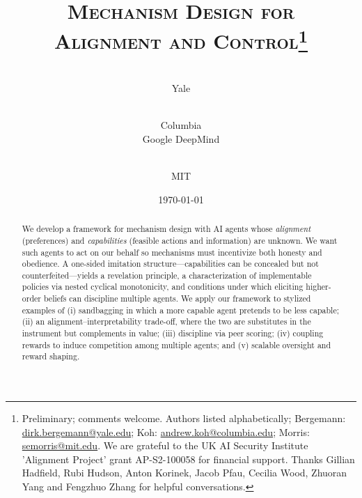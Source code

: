 \documentclass[12pt,reqno]{article}
\theoremstyle{definition} \newtheorem{example}{Example}
\theoremstyle{definition} \newtheorem{condition}{Condition}
\theoremstyle{definition} \newtheorem{corollary}{Corollary}
\theoremstyle{definition} \newtheorem{claim}{Claim}
\theoremstyle{definition} \newtheorem{definition}{Definition}
\theoremstyle{definition} \newtheorem{conjecture}{Conjecture}
\theoremstyle{definition} \newtheorem{Lemma}{Lemma}
\theoremstyle{definition} \newtheorem{lemma}{Lemma}
\theoremstyle{plain} \newtheorem{theorem}{Theorem}
\theoremstyle{definition} \newtheorem{assumption}{Assumption}
\theoremstyle{definition} \newtheorem*{assumptionnonumber}{Assumption}
\theoremstyle{definition} \newtheorem*{theoremNoNumber}{Proposition}
\theoremstyle{definition}\newtheorem{proposition}{Proposition}
\theoremstyle{definition} \newtheorem{observation}{Observation}
\theoremstyle{definition} \newtheorem*{definitionNoNumber}{Definition}
\theoremstyle{definition} \newtheorem{Definition}{Definition}
\theoremstyle{definition} \newtheorem*{DefinitionNoNumber}{Definition}
\theoremstyle{definition} \newtheorem*{fact}{Fact}
\theoremstyle{definition} \newtheorem*{property}{Property}
\theoremstyle{definition} \newtheorem{remark}{Remark}
\theoremstyle{definition}\newtheorem{romanexampleinner}{Example}
\begin{document}
\title{{\scshape{\textbf{Mechanism Design for \\ Alignment and Control}}}\thanks{\footnotesize Preliminary; comments welcome. Authors listed alphabetically; Bergemann: \url{dirk.bergemann@yale.edu}; Koh: \url{andrew.koh@columbia.edu}; Morris: \url{semorris@mit.edu}. We are grateful to the UK AI Security Institute 'Alignment Project' grant AP-S2-100058 for financial support. Thanks Gillian Hadfield, Rubi Hudson, Anton Korinek, Jacob Pfau, Cecilia Wood, Zhuoran Yang and Fengzhuo Zhang for helpful conversations.
}}


\author{\\ \small{Yale}
\and {} \\
\small{Columbia}\\[-0.4em]
\small{Google DeepMind}
\and {} \\
\small{MIT}
}

\date{\today}


\maketitle 

%

\begin{abstract}
We develop a framework for mechanism design with AI agents whose \emph{alignment} (preferences) and \emph{capabilities} (feasible actions and information) are unknown. We want such agents to act on our behalf so mechanisms must incentivize both honesty and obedience. A one-sided imitation structure---capabilities can be concealed but not counterfeited---yields a revelation principle, a characterization of implementable policies via nested cyclical monotonicity, and conditions under which eliciting higher-order beliefs can discipline multiple agents. We apply our framework to stylized examples of (i) {sandbagging} in which a more capable agent pretends to be less capable;
(ii) an {alignment--interpretability trade-off}, where the two are substitutes in the instrument but complements in value;  (iii) discipline via peer scoring; (iv) coupling rewards to induce competition among multiple agents; and (v) scalable oversight and reward shaping. 
\end{abstract}

\clearpage 

\setcounter{tocdepth}{2}
{\small\tableofcontents}

%
\end{document}
